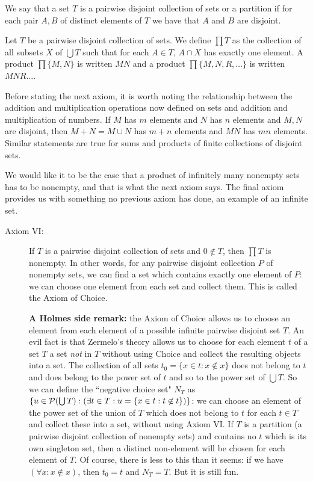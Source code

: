 \documentclass[12pt]{article}
\begin{document}
\begin{enumerate}
We say that a set $T$ is a pairwise disjoint collection of sets or a partition if for each pair $A,B$ of distinct elements of $T$ we have that $A$ and $B$ are disjoint.

Let $T$ be a pairwise disjoint collection of sets.  We define $\prod T$ as the collection of all subsets $X$ of $\bigcup T$ such that for each $A \in T$, $A\cap X$ has exactly one element.
A product $\prod\{M,N\}$ is written $MN$ and a product $\prod\{M,N,R,\ldots\}$ is written $MNR\ldots$.

Before stating the next axiom, it is worth noting the relationship between the addition and multiplication operations now defined on sets and addition and multiplication of numbers.
If $M$ has $m$ elements and $N$ has $n$ elements and $M,N$ are disjoint, then $M+N = M \cup N$ has $m+n$ elements and $MN$ has $mn$ elements.  Similar statements are true for sums and products of finite collections of disjoint sets.

We would like it to be the case that a product of infinitely many nonempty sets has to be nonempty, and that is what the next axiom says.  The final axiom provides us with something no previous axiom has done, an example of an infinite set.

\begin{description}

\item[Axiom VI:]  If $T$ is a pairwise disjoint collection of sets and $0 \not\in T$, then $\prod T$ is nonempty.  In other words, for any pairwise disjoint collection $P$ of nonempty sets, we can find a set which contains exactly one element of $P$:  we can choose one element from each set and collect them.  This is called the Axiom of Choice.

{\bf A Holmes side remark:}  the Axiom of Choice allows us to choose an element from each element of a possible infinite pairwise disjoint set $T$.  An evil fact is that Zermelo's theory allows us to choose for each element $t$ of a set $T$ a set {\em not\/} in $T$ without using Choice and collect the resulting objects into a set. The collection of all sets $t_0 = \{x \in t:x \not\in x\}$ does not belong to $t$ and does
belong to the power set of $t$ and so to the power set of $\bigcup T$.  So we can define the ``negative choice set" $N_T$ as $\{u \in {\cal P}(\bigcup T):(\exists t \in T:u = \{x \in t:t \not\in t\})\}$:  we can choose an element of the power set of the union of $T$ which does not belong to $t$ for each $t \in T$ and collect these into a set, without using Axiom VI.  If $T$
is a partition (a pairwise disjoint collection of nonempty sets) and contains no $t$ which is its own singleton set, then a distinct non-element will be chosen for each element of $T$.  Of course, there is less to this than it seems:  if we have $(\forall x:x \not\in x)$, then $t_0 = t$ and $N_T = T$.  But it is still fun.


\end{description}
\end{enumerate}
\end{document}
